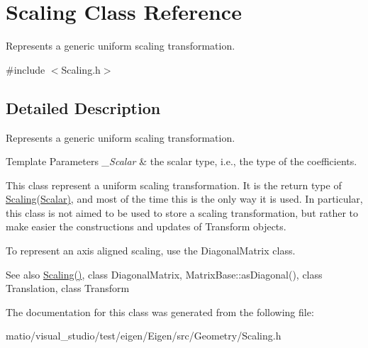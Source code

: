 \hypertarget{class_scaling}{}\section{Scaling Class Reference}
\label{class_scaling}


Represents a generic uniform scaling transformation.  




{\ttfamily \#include $<$Scaling.\+h$>$}



\subsection{Detailed Description}
Represents a generic uniform scaling transformation. 


\begin{DoxyTemplParams}{Template Parameters}
{\em \+\_\+\+Scalar} & the scalar type, i.\+e., the type of the coefficients.\\
\hline
\end{DoxyTemplParams}
This class represent a uniform scaling transformation. It is the return type of \hyperlink{class_scaling}{Scaling(\+Scalar)}, and most of the time this is the only way it is used. In particular, this class is not aimed to be used to store a scaling transformation, but rather to make easier the constructions and updates of Transform objects.

To represent an axis aligned scaling, use the Diagonal\+Matrix class.

\begin{DoxySeeAlso}{See also}
\hyperlink{group___geometry___module_ga23a8ed57e3f2973526026765ae697761}{Scaling()}, class Diagonal\+Matrix, Matrix\+Base\+::as\+Diagonal(), class Translation, class Transform 
\end{DoxySeeAlso}


The documentation for this class was generated from the following file\+:\begin{DoxyCompactItemize}
\item 
matio/visual\+\_\+studio/test/eigen/\+Eigen/src/\+Geometry/\+Scaling.\+h\end{DoxyCompactItemize}
